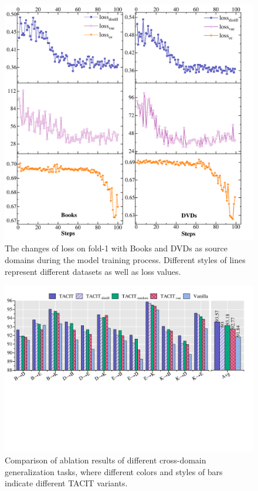 \documentclass[letterpaper]{article} %
\begin{document}
\begin{figure}[t]
	\centering
	\includegraphics[width=0.99\columnwidth]{loss.pdf} 
	\caption{The changes of loss on fold-1 with Books and DVDs as source domains during the model training process. Different styles of lines represent different datasets as well as loss values. }
	\label{fig:loss}
\end{figure}

\begin{figure}[t]
	\centering
	\includegraphics[width=1.7\columnwidth]{abl.pdf} 
	\caption{Comparison of ablation results of different cross-domain generalization tasks, where different colors and styles of bars indicate different TACIT variants. }
	\label{fig:abl}
\end{figure}
\end{document}
